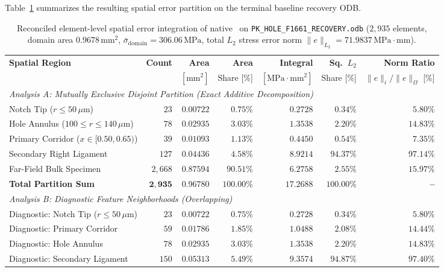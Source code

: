 Table~\ref{tab:miseseri_spatial_integration} summarizes the resulting spatial error partition on the terminal baseline recovery ODB.

\begin{table}[htbp]
\centering
\small
\caption{Reconciled element-level spatial error integration of native \Abaqus \MISESERI\ on \texttt{PK\_HOLE\_F1661\_RECOVERY.odb} ($2{,}935$ elements, domain area $0.9678\,\mathrm{mm}^2$, $\bar{\sigma}_{\mathrm{domain}} = 306.06\,\mathrm{MPa}$, total $L_2$ stress error norm $\|e\|_{L_2} = 71.9837\,\mathrm{MPa}\cdot\mathrm{mm}$).}
\label{tab:miseseri_spatial_integration}
\begin{tabularx}{\textwidth}{lrrrrrr}
\hline
\textbf{Spatial Region} & \textbf{Count} & \textbf{Area} & \textbf{Area} & \textbf{Integral} & \textbf{Sq.\ $L_2$} & \textbf{Norm Ratio} \\
 & & $[\mathrm{mm}^2]$ & Share [\%] & $[\mathrm{MPa}\cdot\mathrm{mm}^2]$ & Share [\%] & $\|e\|_i / \|e\|_{\Omega}$ [\%] \\
\hline
\multicolumn{7}{l}{\textit{Analysis A: Mutually Exclusive Disjoint Partition (Exact Additive Decomposition)}} \\
Notch Tip ($r \le 50\,\mu\mathrm{m}$) & $23$ & $0.00722$ & $0.75\%$ & $0.2728$ & $0.34\%$ & $5.80\%$ \\
Hole Annulus ($100 \le r \le 140\,\mu\mathrm{m}$) & $78$ & $0.02935$ & $3.03\%$ & $1.3538$ & $2.20\%$ & $14.83\%$ \\
Primary Corridor ($x \in [0.50, 0.65)$) & $39$ & $0.01093$ & $1.13\%$ & $0.4450$ & $0.54\%$ & $7.35\%$ \\
Secondary Right Ligament & $127$ & $0.04436$ & $4.58\%$ & $8.9214$ & $94.37\%$ & $97.14\%$ \\
Far-Field Bulk Specimen & $2{,}668$ & $0.87594$ & $90.51\%$ & $6.2758$ & $2.55\%$ & $15.97\%$ \\
\textbf{Total Partition Sum} & $\mathbf{2{,}935}$ & $\mathbf{0.96780}$ & $\mathbf{100.00\%}$ & $\mathbf{17.2688}$ & $\mathbf{100.00\%}$ & \textbf{--} \\
\hline
\multicolumn{7}{l}{\textit{Analysis B: Diagnostic Feature Neighborhoods (Overlapping)}} \\
Diagnostic: Notch Tip ($r \le 50\,\mu\mathrm{m}$) & $23$ & $0.00722$ & $0.75\%$ & $0.2728$ & $0.34\%$ & $5.80\%$ \\
Diagnostic: Primary Corridor & $59$ & $0.01786$ & $1.85\%$ & $1.0488$ & $2.08\%$ & $14.44\%$ \\
Diagnostic: Hole Annulus & $78$ & $0.02935$ & $3.03\%$ & $1.3538$ & $2.20\%$ & $14.83\%$ \\
Diagnostic: Secondary Ligament & $150$ & $0.05313$ & $5.49\%$ & $9.3574$ & $94.87\%$ & $97.40\%$ \\
\hline
\end{tabularx}
\end{table}

